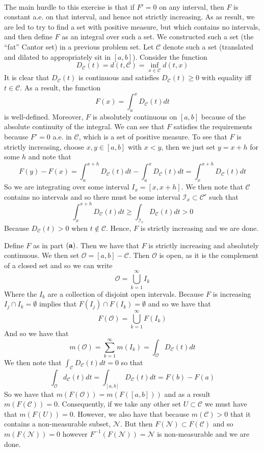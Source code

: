 \documentclass{article}
\newcommand{\problem}[1]{\noindent{\textbf{Problem #1}}\\}
\newcommand{\problempart}[1]{\noindent{\textbf{(#1)}}}
\begin{document}
\problem{3.5.20}
\problempart{a} The main hurdle to this exercise is that if $F' = 0$ on any interval, then $F$ is constant a.e. on that interval, and hence not strictly increasing. As as result, we are led to try to find a set with positive measure, but which contains no intervals, and then define $F$ as an integral over such a set. We constructed such a set (the ``fat'' Cantor set) in a previous problem set. Let $\mathcal{C}$ denote such a set (translated and dilated to appropriately sit in $[a,b]$). Consider the function
\[
D_\mathcal{C}(t) = d(t,\mathcal{C}) = \inf_{x\in \mathcal{C}} d(t,x)
\]
It is clear that $D_\mathcal{C}(t)$ is continuous and satisfies $D_\mathcal{C}(t) \geq 0$ with equality iff $t\in \mathcal{C}$. As a result, the function
\[
F(x) = \int_a^x D_\mathcal{C}(t)dt
\]
is well-defined. Moreover, $F$ is absolutely continuous on $[a,b]$ because of the absolute continuity of the integral. We can see that $F$ satisfies the requirements because $F' = 0$ a.e. in $\mathcal{C}$, which is a set of positive measure. To see that $F$ is strictly increasing, choose $x,y \in [a,b]$ with $x < y$, then we just set $y = x + h$ for some $h$ and note that 
\[
F(y) - F(x) = \int_a^{x+h} D_\mathcal{C}(t)dt - \int_a^{x} D_\mathcal{C}(t)dt = \int_x^{x+h} D_\mathcal{C}(t)dt
\] 
So we are integrating over some interval $I_x = [x,x+h]$. We then note that $\mathcal{C}$ contains no intervals and so there must be some interval $\mathcal{I}_x \subset \mathcal{C^c}$ such that
\[
\int_x^{x+h} D_\mathcal{C}(t)dt \geq \int_{\mathcal{I}_x} D_\mathcal{C}(t)dt > 0
\] 
Because $D_\mathcal{C}(t) > 0$ when $t \not\in \mathcal{C}$. Hence, $F$ is strictly increasing and we are done. 
 
\problempart{b} Define $F$ as in part $\bf{(a)}$. Then we have that $F$ is strictly increasing and absolutely continuous. We then set $\mathcal{O} = [a,b] - \mathcal{C}$. Then $\mathcal{O}$ is open, as it is the complement of a closed set and so we can write
\[
\mathcal{O} = \bigcup_{k=1}^\infty I_k
\]
Where the $I_k$ are a collection of disjoint open intervals. Because $F$ is increasing $I_j \cap I_k = \emptyset$ implies that $F(I_j) \cap F(I_k) = \emptyset$ and so we have that
\[
F(\mathcal{O}) = \bigcup_{k=1}^\infty F(I_k)
\] 
And so we have that
\[
m(\mathcal{O}) = \sum_{k=1}^\infty m(I_k) = \int_{\mathcal{O}}D_\mathcal{C}(t)dt
\]
We then note that $\int_\mathcal{C} D_\mathcal{C}(t)dt = 0$ so that
\[
\int_\mathcal{O} d_\mathcal{C}(t)dt = \int_{[a,b]} D_\mathcal{C}(t)dt = F(b) - F(a)
\]
So we have that $m(F(\mathcal{O})) = m(F([a,b]))$ and as a result $m(F(\mathcal{C})) = 0$. Consequently, if we take any other set $U \subset \mathcal{C}$ we must have that $m(F(U)) = 0$. However, we also have that because $m(\mathcal{C}) > 0$ that it contains a non-measurable subset, $\mathcal{N}$. But then $F(\mathcal{N}) \subset F(\mathcal{C})$ and so $m(F(\mathcal{N})) = 0$ however $F^{-1}(F(\mathcal{N})) = \mathcal{N}$ is non-measurable and we are done. 
\end{document}
